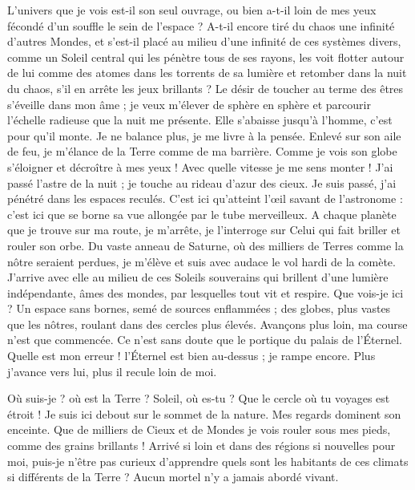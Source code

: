 \documentclass[a4paper, 11pt, oneside]{article}
\begin{document}
L'univers que je vois est-il son seul ouvrage, ou bien a-t-il loin de mes yeux fécondé d'un souffle le sein de l'espace ? A-t-il encore tiré du chaos une infinité d'autres Mondes, et s'est-il placé au milieu d'une infinité de ces systèmes divers, comme un Soleil central qui les pénètre tous de ses rayons, les voit flotter autour de lui comme des atomes dans les torrents de sa lumière et retomber dans la nuit du chaos, s'il en arrête les jeux brillants ? Le désir de toucher au terme des êtres s'éveille dans mon âme ; je veux m'élever de sphère en sphère et parcourir l'échelle radieuse que la nuit me présente. Elle s'abaisse jusqu'à l'homme, c'est pour qu'il monte. Je ne balance plus, je me livre à la pensée. Enlevé sur son aile de feu, je m'élance de la Terre comme de ma barrière. Comme je vois son globe s'éloigner et décroître à mes yeux ! Avec quelle vitesse je me sens monter ! J'ai passé l'astre de la nuit ; je touche au rideau d'azur des cieux. Je suis passé, j'ai pénétré dans les espaces reculés. C'est ici qu'atteint l'œil savant de l'astronome : c'est ici que se borne sa vue allongée par le tube merveilleux. A chaque planète que je trouve sur ma route, je m'arrête, je l'interroge sur Celui qui fait briller et rouler son orbe. Du vaste anneau de Saturne, où des milliers de Terres comme la nôtre seraient perdues, je m'élève et suis avec audace le vol hardi de la comète. J'arrive avec elle au milieu de ces Soleils souverains qui brillent d'une lumière indépendante, âmes des mondes, par lesquelles tout vit et respire. Que vois-je ici ? Un espace sans bornes, semé de sources enflammées ; des globes, plus vastes que les nôtres, roulant dans des cercles plus élevés. Avançons plus loin, ma course n'est que commencée. Ce n'est sans doute que le portique du palais de l'Éternel. Quelle est mon erreur ! l'Éternel est bien au-dessus ; je rampe encore. Plus j'avance vers lui, plus il recule loin de moi.

Où suis-je ? où est la Terre ? Soleil, où es-tu ? Que le cercle où tu voyages est étroit ! Je suis ici debout sur le sommet de la nature. Mes regards dominent son enceinte. Que de milliers de Cieux et de Mondes je vois rouler sous mes pieds, comme des grains brillants ! Arrivé si loin et dans des régions si nouvelles pour moi, puis-je n'être pas curieux d'apprendre quels sont les habitants de ces climats si différents de la Terre ? Aucun mortel n'y a jamais abordé vivant.
\end{document}
